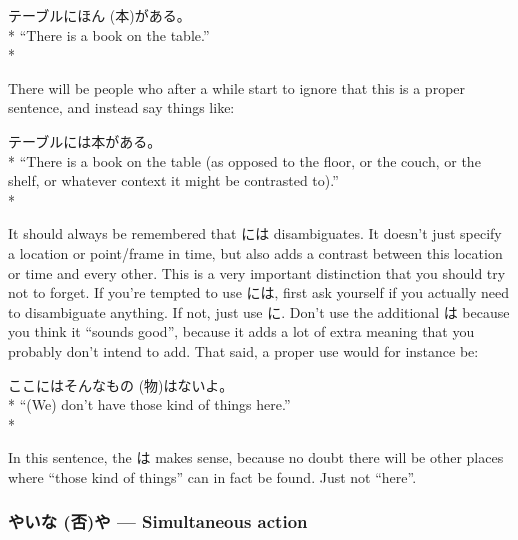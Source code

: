 \documentclass[11pt, b5paper, twoside, openright, onecolumn]{book}
\makeatletter
\newcommand*{\rubystack}[2]{{\relscale{0.5}%
  \begin{tabular}[b]{@{}c@{}}%
    {#1}\\%
   {\textscale{2}{#2}}%
  \end{tabular}}%
}
\DeclareRobustCommand*{\ruby}[2]{%
  \mbox{%
    \setlength{\parskip}{0ex}%
    \BeginAccSupp{method=pdfstringdef,ActualText={#1}}%
      \rubystack{\phantom{#2}}{#1}%
      \llap{%
        \rubystack{#2}{\phantom{#1}}%
      }%
    \EndAccSupp{}%
  }%
}
\renewcommand*{\ruby}[2]{#2 (#1)}%
\newenvironment{exampleblock}{
\setlength{\parindent}{0.6in}
\begin{minipage}[t]{\dimexpr\textwidth-\parindent}}
{\end{minipage}}
\makeatother
\begin{document}
\vspace{0.4cm}
\begin{exampleblock}
テーブルに\ruby{本}{ほん}がある。 \\* 
“There is a book on the table.” \\* 
\end{exampleblock}
\vspace{0.2cm}

There will be people who after a while start to ignore that this is a proper sentence‚ and instead say things like:

\vspace{0.4cm}
\begin{exampleblock}
テーブルには本がある。 \\* 
“There is a book on the table (as opposed to the floor‚ or the couch‚ or the shelf‚ or whatever context it might be contrasted to).” \\* 
\end{exampleblock}
\vspace{0.2cm}

It should always be remembered that には disambiguates. It doesn’t just specify a location or point/frame in time‚ but also adds a contrast between this location or time and every other. This is a very important distinction that you should try not to forget. If you’re tempted to use には‚ first ask yourself if you actually need to disambiguate anything. If not‚ just use に. Don’t use the additional は because you think it “sounds good”‚ because it adds a lot of extra meaning that you probably don’t intend to add. That said‚ a proper use would for instance be:

\vspace{0.4cm}
\begin{exampleblock}
ここにはそんな\ruby{物}{もの}はないよ。 \\* 
“(We) don’t have those kind of things here.” \\* 
\end{exampleblock}
\vspace{0.2cm}

In this sentence‚ the は makes sense‚ because no doubt there will be other places where “those kind of things” can in fact be found. Just not “here”.

\subsubsection{や\ruby{否}{いな}や — Simultaneous action}
\end{document}
